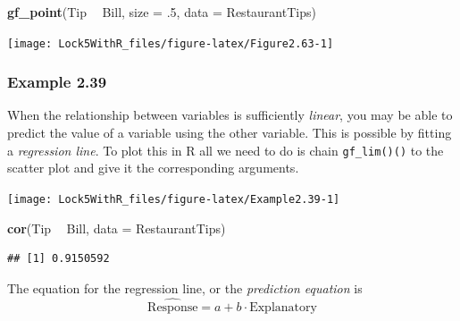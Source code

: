 \documentclass[]{book}
\newenvironment{Shaded}{\begin{snugshade}}{\end{snugshade}}
\newcommand{\DataTypeTok}[1]{\textcolor[rgb]{0.13,0.29,0.53}{#1}}
\newcommand{\FloatTok}[1]{\textcolor[rgb]{0.00,0.00,0.81}{#1}}
\newcommand{\KeywordTok}[1]{\textcolor[rgb]{0.13,0.29,0.53}{\textbf{#1}}}
\newcommand{\NormalTok}[1]{#1}
\newcommand{\OperatorTok}[1]{\textcolor[rgb]{0.81,0.36,0.00}{\textbf{#1}}}
\newcommand{\StringTok}[1]{\textcolor[rgb]{0.31,0.60,0.02}{#1}}
\begin{document}
\begin{Shaded}
\begin{Highlighting}[]
\KeywordTok{gf_point}\NormalTok{(Tip }\OperatorTok{~}\StringTok{ }\NormalTok{Bill, }\DataTypeTok{size =} \FloatTok{.5}\NormalTok{, }\DataTypeTok{data =}\NormalTok{ RestaurantTips)}
\end{Highlighting}
\end{Shaded}

\texttt{[image: Lock5WithR\_files/figure-latex/Figure2.63-1]}

\hypertarget{example-2.39}{%
\subsubsection{Example 2.39}\label{example-2.39}}

When the relationship between variables is sufficiently \emph{linear}, you may be able to predict the value of a variable using the other variable. This is possible by fitting a \emph{regression line}. To plot this in R all we need to do is chain \texttt{gf\_lim()()} to the scatter plot and give it the corresponding arguments.

\begin{Shaded}
\end{Shaded}

\texttt{[image: Lock5WithR\_files/figure-latex/Example2.39-1]}

\begin{Shaded}
\begin{Highlighting}[]
\KeywordTok{cor}\NormalTok{(Tip }\OperatorTok{~}\StringTok{ }\NormalTok{Bill, }\DataTypeTok{data =}\NormalTok{ RestaurantTips)}
\end{Highlighting}
\end{Shaded}

\begin{verbatim}
## [1] 0.9150592
\end{verbatim}

The equation for the regression line, or the \emph{prediction equation} is
\[
\widehat{\mbox{Response}} = a + b \cdot \mbox{Explanatory}
\]
\end{document}
